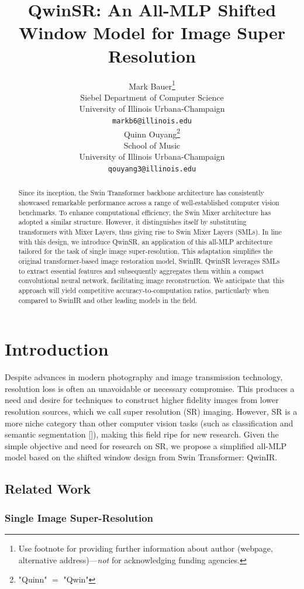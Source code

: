 \documentclass{article}
\title{QwinSR: An All-MLP Shifted Window Model for Image Super Resolution}
\author{
  Mark Bauer\thanks{Use footnote for providing further information
    about author (webpage, alternative address)---\emph{not} for acknowledging
    funding agencies.} \\
  Siebel Department of Computer Science\\
  University of Illinois Urbana-Champaign\\
  \texttt{markb6@illinois.edu} \\
  \And
  Quinn Ouyang\thanks{"Quinn" $=$ "Qwin"} \\
  School of Music \\
  University of Illinois Urbana-Champaign \\
  \texttt{qouyang3@illinois.edu} \\
}
\begin{document}
\maketitle

\begin{abstract}
    Since its inception, the Swin Transformer backbone architecture has consistently showcased remarkable performance across a range of well-established computer vision benchmarks. To enhance computational efficiency, the Swin Mixer architecture has adopted a similar structure. However, it distinguishes itself by substituting transformers with Mixer Layers, thus giving rise to Swin Mixer Layers (SMLs). In line with this design, we introduce QwinSR, an application of this all-MLP architecture tailored for the task of single image super-resolution. This adaptation simplifies the original transformer-based image restoration model, SwinIR. QwinSR leverages SMLs to extract essential features and subsequently aggregates them within a compact convolutional neural network, facilitating image reconstruction. We anticipate that this approach will yield competitive accuracy-to-computation ratios, particularly when compared to SwinIR and other leading models in the field.
\end{abstract}

\section{Introduction}

Despite advances in modern photography and image transmission technology, resolution loss is often an unavoidable or necessary compromise. This produces a need and desire for techniques to construct higher fidelity images from lower resolution sources, which we call super resolution (SR) imaging. However, SR is a more niche category than other computer vision tasks (such as classification and semantic segmentation []), making this field ripe for new research. Given the simple objective and need for research on SR, we propose a simplified all-MLP model based on the shifted window design from Swin Transformer: QwinIR.

\subsection{Related Work}

\subsubsection{Single Image Super-Resolution}
\end{document}
